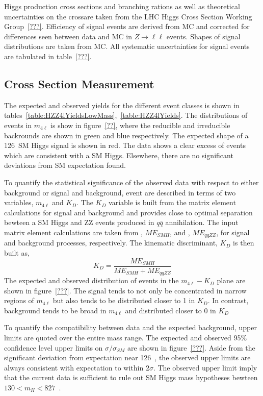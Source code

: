 Higgs production cross sections and branching rations as well 
as theoretical uncertainties on the crossare taken from the LHC 
Higgs Cross Section Working Group~\ref{???}.  Efficiency of 
signal events are derived from MC and corrected for differences
seen between data and MC in $Z\to\ell\ell$ events.  Shapes of 
signal distributions are taken from MC.  All systematic 
uncertainties for signal events are tabulated in table~\ref{???}.

\subsection{Cross Section Measurement}
\label{sec:HZZ4lxsec}

The expected and observed yields for the different event classes
is shown in tables~\ref{table:HZZ4lYieldsLowMass},~\ref{table:HZZ4lYields}.  
The distributions of events in $m_{4\ell}$ is show in figure~\ref{??},
where the reducible and irreducible backrounds are shown in green
and blue respectively.  The expected shape of a 126~\GeV SM Higgs
signal is shown in red.  The data shows a clear excess of events 
which are consistent with a SM Higgs.  Elsewhere, there are no
significant deviations from SM expectation found.  

To quantify the statistical significance of the observed data
with respect to either background or signal and background, event
are described in terms of two variables, $m_{4\ell}$ and $K_D$.
The $K_D$ variable is built from the matrix element calculations
for signal and background and provides close to optimal separation
bewteen a SM Higgs and ZZ events produced in $q\bar{q}$
annihilation.  The input matrix element calculations are taken
from \JHUGen, $ME_{SMH}$, and \MCFM, $ME_{qqZZ}$, for signal and 
background processes, respectively.  The kinematic discriminant, 
$K_D$ is then built as,
\begin{equation}
K_D = \frac{ME_{SMH}}{ME_{SMH}+ME_{qqZZ}}
\end{equation}
The expected and observed distribution of events in the 
$m_{4\ell}-K_D$ plane are shown in figure~\ref{???}.  The signal
tends to not only be concentrated in narrow regions of $m_{4\ell}$
but also tends to be distributed closer to 1 in $K_D$.  In 
contrast, background tends to be broad in $m_{4\ell}$ and
distributed closer to 0 in $K_D$

To quantify the compatibility between data and the expected
background, upper limits are quoted over the entire mass range.  
The expected and observed 95\% confidence level upper limits on
$\sigma/\sigma_{SM}$ are
shown in figure~\ref{???}.  Aside from the significant deviation
from expectation near 126~\GeV, the observed upper limits are 
always consistent with expectation to within $2\sigma$.  The
observed upper limit imply that the current data is sufficient
to rule out SM Higgs mass hypotheses bewteen $130<m_{H}<827$~\GeV.

